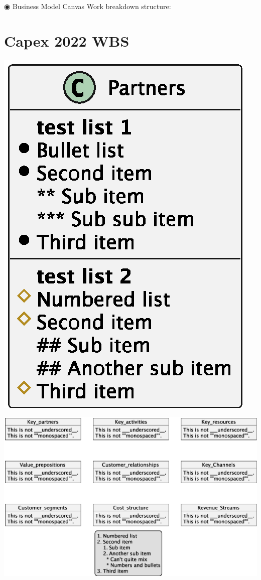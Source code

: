 \documentclass[11pt]{article}
\author{Ricardo Antunes}
\date{\today}
\title{}
\begin{document}
\tableofcontents

◉ Business Model Canvas Work breakdown structure:
\section{Capex 2022 WBS}
\label{sec:orgbb01faf}

\label{fig_wbs}
\begin{center}
\includegraphics[width=.9\linewidth]{Resources/business_model_canvas.eps}
\end{center}

\begin{center}
\includegraphics[width=.9\linewidth]{Resources/business_model_canvas_test.eps}
\end{center}
\end{document}
